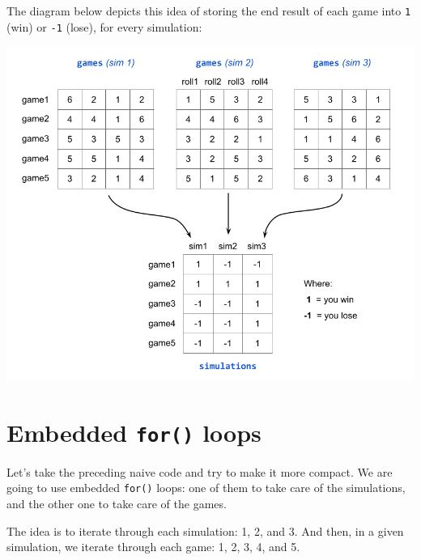 \documentclass[
]{book}
\begin{document}
The diagram below depicts this idea of storing the end result of each game
into \texttt{1} (win) or \texttt{-1} (lose), for every simulation:

\begin{center}\includegraphics[width=0.8\linewidth]{images/demere-3-sims-loop} \end{center}

\hypertarget{embedded-for-loops}{%
\section{\texorpdfstring{Embedded \texttt{for()} loops}{Embedded for() loops}}\label{embedded-for-loops}}

Let's take the preceding naive code and try to make it more compact. We are
going to use embedded \texttt{for()} loops: one of them to take care of the simulations,
and the other one to take care of the games.

The idea is to iterate through each simulation: 1, 2, and 3. And then, in a
given simulation, we iterate through each game: 1, 2, 3, 4, and 5.
\end{document}
